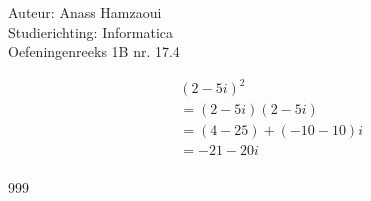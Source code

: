 \documentclass[a4paper]{article}
\begin{document}
  
\noindent \large Auteur: Anass Hamzaoui \\
\noindent \large Studierichting: Informatica \\
\noindent \large Oefeningenreeks 1B nr. 17.4 \\

\medskip

\normalsize

\begin{eqnarray*}
    && (2 - 5i)^2 \\
    && = (2 - 5i)(2 - 5i) \\
    && = (4 - 25) + (-10 - 10)i \\
    && = -21 - 20i \\
\end{eqnarray*}

\begin{thebibliography}{999}
\end{thebibliography}
\end{document}
